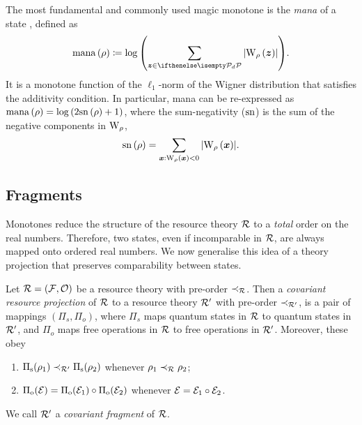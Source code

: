 \documentclass[pra,
aps,
twocolumn,
superscriptaddress,
groupedaddress,
nofootinbib,
reprint
]{revtex4-1}
\begin{document}
The most fundamental and commonly used magic monotone is the \emph{mana} of a state , defined as
\begin{equation}
    \mana{\rho} \coloneqq \log{\left(\sum\limits_{\bmz \in \pd} \abs{\W[\bmz]{\rho}}\right)}.
\end{equation}
It is a monotone function of the $\ell_1$-norm of the Wigner distribution that satisfies the additivity condition.
In particular, mana can be re-expressed as ${{\rm{mana}}\left(\rho\right)} = \log{(2 {{\rm{sn}}\left(\rho\right)} +1)}$, where the sum-negativity ($\rm{sn}$)  is the sum of the negative components in $\W{\rho}$,
\begin{equation}
	\sn{\rho} = \sum\limits_{\bmx: \W[\bmx]{\rho} < 0} \abs{\W[\bmx]{\rho}}.
\end{equation}

\subsection{Fragments}

Monotones reduce the structure of the resource theory $\mathcal{R}$ to a \emph{total} order on the real numbers.
Therefore, two states, even if incomparable in $\mathcal{R}$, are always mapped onto ordered real numbers.
We now generalise this idea of a theory projection that preserves comparability between states. 
\begin{definition}\label{def:covproj}
Let $\mathcal{R} = (\mathcal{F}, \mathcal{O})$ be a resource theory with pre-order $\prec_{\mathcal{R}}$. 
Then a \emph{covariant resource projection} of $\mathcal{R}$ to a resource theory $\mathcal{R}'$ with pre-order $\prec_{\mathcal{R}'}$, is a pair of mappings $(\Pi_s, \Pi_o)$, where $\Pi_s$ maps quantum states in $\mathcal{R}$ to quantum states in $\mathcal{R}'$, and $\Pi_o$ maps free operations in $\mathcal{R}$ to free operations in $\mathcal{R}'$. 
Moreover, these obey
	\begin{enumerate}
        \item $\Pi_{\rm{s}}(\rho_1) \prec_{\mathcal{R}'} \Pi_{\rm{s}}(\rho_2)$ whenever $\rho_1 \prec_{\mathcal{R}} \rho_2$;
        \item $\Pi_{\rm{o}}(\mathcal{E}) = \Pi_{\rm{o}}(\mathcal{E}_1) \circ \Pi_{\rm{o}}(\mathcal{E}_2)$ whenever $\mathcal{E} = \mathcal{E}_1 \circ \mathcal{E}_2$.
    \end{enumerate}
We call $\mathcal{R}'$ a \emph{covariant fragment} of $\mathcal{R}$.
\end{definition}
\end{document}
